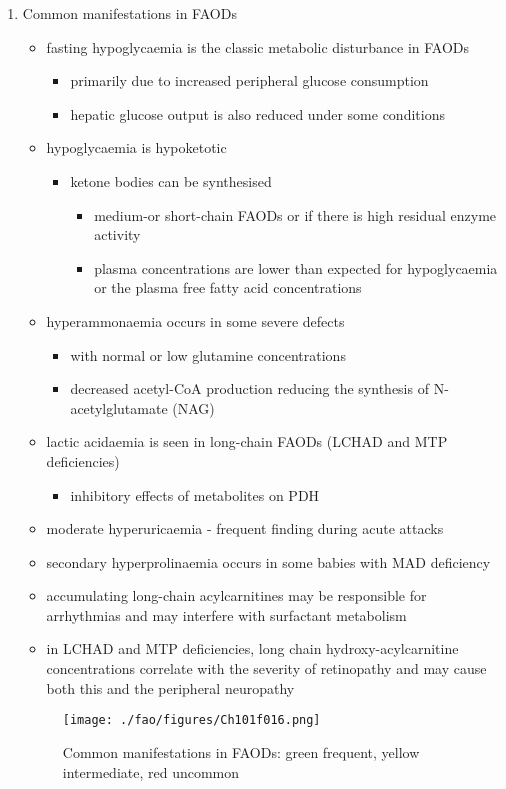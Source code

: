 \documentclass{scrartcl}
\begin{document}
\begin{enumerate}
\item Common manifestations in FAODs
\label{sec:org18b383b}
\begin{itemize}
\item fasting hypoglycaemia is the classic metabolic disturbance in FAODs
\begin{itemize}
\item primarily due to increased peripheral glucose consumption
\item hepatic glucose output is also reduced under some conditions
\end{itemize}
\item hypoglycaemia is hypoketotic
\begin{itemize}
\item ketone bodies can be synthesised
\begin{itemize}
\item medium-or short-chain FAODs or if there is high residual enzyme activity
\item plasma concentrations are lower than expected for hypoglycaemia or the plasma free fatty acid concentrations
\end{itemize}
\end{itemize}
\item hyperammonaemia occurs in some severe defects
\begin{itemize}
\item with normal or low glutamine concentrations
\item decreased acetyl-CoA production reducing the synthesis of N-acetylglutamate (NAG)
\end{itemize}
\item lactic acidaemia is seen in long-chain FAODs (LCHAD and MTP deficiencies)
\begin{itemize}
\item inhibitory effects of metabolites on PDH
\end{itemize}
\item moderate hyperuricaemia - frequent finding during acute attacks
\item secondary hyperprolinaemia occurs in some babies with MAD deficiency
\item accumulating long-chain acylcarnitines may be responsible for
arrhythmias and may interfere with surfactant metabolism
\item in LCHAD and MTP deficiencies, long chain hydroxy-acylcarnitine
concentrations correlate with the severity of retinopathy and may
cause both this and the peripheral neuropathy
\end{itemize}

\begin{figure}[htbp]
\centering
\texttt{[image: ./fao/figures/Ch101f016.png]}
\caption{\label{fig:org7a5cdd7}
Common manifestations in FAODs: green frequent, yellow intermediate, red uncommon}
\end{figure}
\end{enumerate}
\end{document}
